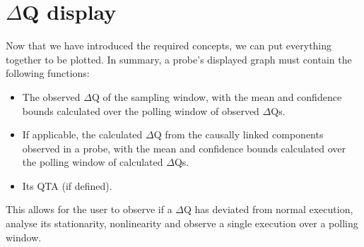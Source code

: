 \section{$\Delta$Q display}
    Now that we have introduced the required concepts, we can put everything together to be plotted. In summary, a probe's displayed graph must contain the following functions:
    \begin{itemize}
        \item The observed $\Delta$Q of the sampling window, with the mean and confidence bounds calculated over the polling window of observed $\Delta$Qs.
        \item If applicable, the calculated $\Delta$Q from the causally linked components observed in a probe, with the mean and confidence bounds calculated over the polling window of calculated $\Delta$Qs.
        \item Its QTA (if defined).
    \end{itemize}
    This allows for the user to observe if a $\Delta$Q has deviated from normal execution, analyse its stationarity, nonlinearity and observe a single execution over a polling window.


